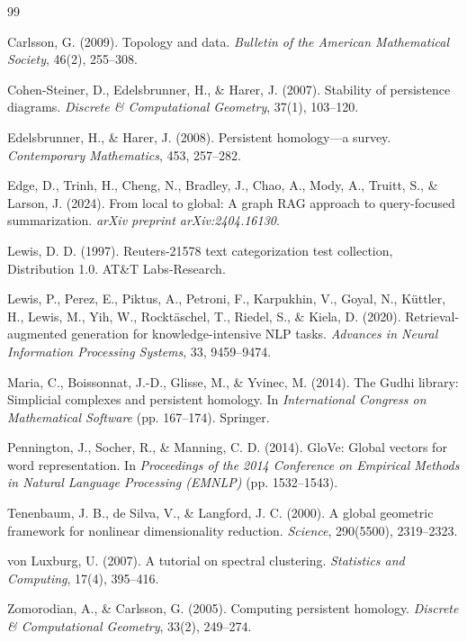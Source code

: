 \documentclass[11pt]{article}
\begin{document}

\begin{thebibliography}{99}

Carlsson, G. (2009). Topology and data. \textit{Bulletin of the American Mathematical Society}, 46(2), 255--308.

Cohen-Steiner, D., Edelsbrunner, H., \& Harer, J. (2007). Stability of persistence diagrams. \textit{Discrete \& Computational Geometry}, 37(1), 103--120.

Edelsbrunner, H., \& Harer, J. (2008). Persistent homology---a survey. \textit{Contemporary Mathematics}, 453, 257--282.

Edge, D., Trinh, H., Cheng, N., Bradley, J., Chao, A., Mody, A., Truitt, S., \& Larson, J. (2024). From local to global: A graph RAG approach to query-focused summarization. \textit{arXiv preprint arXiv:2404.16130}.

Lewis, D. D. (1997). Reuters-21578 text categorization test collection, Distribution 1.0. AT\&T Labs-Research.

Lewis, P., Perez, E., Piktus, A., Petroni, F., Karpukhin, V., Goyal, N., K\"uttler, H., Lewis, M., Yih, W., Rockt\"aschel, T., Riedel, S., \& Kiela, D. (2020). Retrieval-augmented generation for knowledge-intensive NLP tasks. \textit{Advances in Neural Information Processing Systems}, 33, 9459--9474.

Maria, C., Boissonnat, J.-D., Glisse, M., \& Yvinec, M. (2014). The Gudhi library: Simplicial complexes and persistent homology. In \textit{International Congress on Mathematical Software} (pp. 167--174). Springer.

Pennington, J., Socher, R., \& Manning, C. D. (2014). GloVe: Global vectors for word representation. In \textit{Proceedings of the 2014 Conference on Empirical Methods in Natural Language Processing (EMNLP)} (pp. 1532--1543).

Tenenbaum, J. B., de Silva, V., \& Langford, J. C. (2000). A global geometric framework for nonlinear dimensionality reduction. \textit{Science}, 290(5500), 2319--2323.

von Luxburg, U. (2007). A tutorial on spectral clustering. \textit{Statistics and Computing}, 17(4), 395--416.

Zomorodian, A., \& Carlsson, G. (2005). Computing persistent homology. \textit{Discrete \& Computational Geometry}, 33(2), 249--274.

\end{thebibliography}
\end{document}
